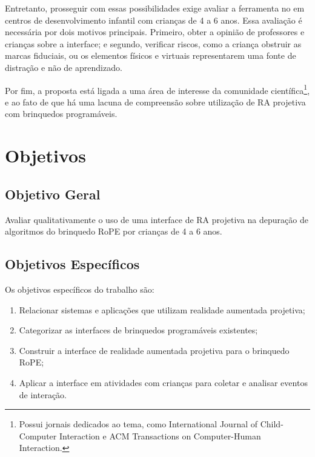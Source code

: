 Entretanto, prosseguir com essas possibilidades exige avaliar a ferramenta no em centros de desenvolvimento infantil com crianças de 4 a 6 anos. Essa avaliação é necessária por dois motivos principais. Primeiro, obter a opinião de professores e crianças sobre a interface; e segundo, verificar riscos, como a criança obstruir as marcas fiduciais, ou os elementos físicos e virtuais representarem uma fonte de distração e não de aprendizado.

Por fim, a proposta está ligada a uma área de interesse da comunidade científica\footnote{Possui jornais dedicados ao tema, como International Journal of Child-Computer Interaction e ACM Transactions on Computer-Human Interaction.}, e ao fato de que há uma lacuna de compreensão sobre utilização de \ac{RA} projetiva com brinquedos programáveis.

\section{Objetivos}
\label{s_cintro_objetivos}

\subsection{Objetivo Geral}
\label{ss_cintro_objetivo_geral}

Avaliar qualitativamente o uso de uma interface de \ac{RA} projetiva na depuração de algoritmos do brinquedo RoPE por crianças de 4 a 6 anos.

\subsection{Objetivos Específicos}
\label{ss_cintro_objetivos_espec}

Os objetivos específicos do trabalho são:

\begin{enumerate}
    
    \item Relacionar sistemas e aplicações que utilizam realidade aumentada projetiva;

    \item\label{obj_mapear} Categorizar as interfaces de brinquedos programáveis existentes;

    \item\label{obj_interface} Construir a interface de realidade aumentada projetiva para o brinquedo RoPE;

    \item\label{obj_avaliar} Aplicar a interface em atividades com crianças para coletar e analisar eventos de interação.
    
\end{enumerate}
